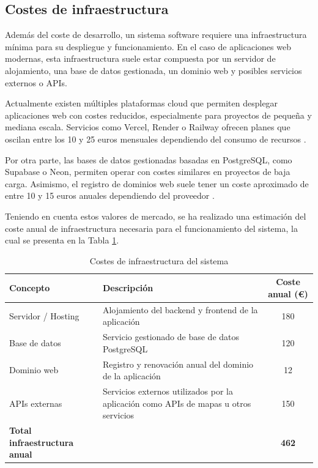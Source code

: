 \subsection{Costes de infraestructura}
Además del coste de desarrollo, un sistema software requiere una infraestructura mínima para su despliegue y funcionamiento. En el caso de aplicaciones web modernas, esta infraestructura suele estar compuesta por un servidor de alojamiento, una base de datos gestionada, un dominio web y posibles servicios externos o APIs.

Actualmente existen múltiples plataformas cloud que permiten desplegar aplicaciones web con costes reducidos, especialmente para proyectos de pequeña y mediana escala. Servicios como Vercel, Render o Railway ofrecen planes que oscilan entre los 10 y 25 euros mensuales dependiendo del consumo de recursos \cite{vercelpricing2024}. 

Por otra parte, las bases de datos gestionadas basadas en PostgreSQL, como Supabase o Neon, permiten operar con costes similares en proyectos de baja carga. Asimismo, el registro de dominios web suele tener un coste aproximado de entre 10 y 15 euros anuales dependiendo del proveedor \cite{namecheap2024domain}.

Teniendo en cuenta estos valores de mercado, se ha realizado una estimación del coste anual de infraestructura necesaria para el funcionamiento del sistema, la cual se presenta en la Tabla \ref{tabla_coste_infraestructura}.

\begin{table}[H]
\centering
\caption{Costes de infraestructura del sistema}
\label{tabla_coste_infraestructura}
\begin{tabular}{|p{5cm}|p{7cm}|c|}
\hline
\textbf{Concepto} & \textbf{Descripción} & \textbf{Coste anual (€)} \\ \hline

Servidor / Hosting &
Alojamiento del backend y frontend de la aplicación &
180 \\ \hline

Base de datos &
Servicio gestionado de base de datos PostgreSQL &
120 \\ \hline

Dominio web &
Registro y renovación anual del dominio de la aplicación &
12 \\ \hline

APIs externas &
Servicios externos utilizados por la aplicación como APIs de mapas u otros servicios &
150 \\ \hline

\textbf{Total infraestructura anual} & & \textbf{462} \\ \hline

\end{tabular}
\end{table}

